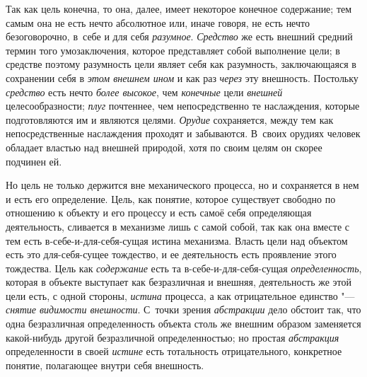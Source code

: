 Так как цель конечна, то она, далее, имеет некоторое конечное
содержание; тем самым она не есть нечто абсолютное или, иначе говоря, не
есть нечто безоговорочно, в~себе и для себя
{\em разумное}.
{\em Средство} же есть
внешний средний термин того умозаключения, которое представляет собой
выполнение цели; в средстве поэтому разумность цели являет себя как
разумность, заключающаяся в сохранении себя в
{\em этом внешнем ином}
и как раз {\em через}
эту внешность. Постольку
{\em средство} есть нечто
{\em более высокое}, чем
{\em конечные} цели
{\em внешней}
целесообразности;
{\em плуг} почтеннее, чем
непосредственно те наслаждения, которые подготовляются им и являются
целями. {\em Орудие}
сохраняется, между тем как непосредственные наслаждения
проходят и забываются. В~своих орудиях человек обладает властью над внешней
природой, хотя по своим целям он скорее подчинен ей.

Но цель не только держится вне механического процесса, но и
сохраняется в нем и есть его определение. Цель, как понятие, которое
существует свободно по отношению к объекту и его процессу и есть самоё себя
определяющая деятельность, сливается в механизме лишь с самой собой, так
как она вместе с тем есть в-себе-и-для-себя-сущая истина механизма. Власть
цели над объектом есть это для-себя-сущее тождество, и ее деятельность есть
проявление этого тождества. Цель как
{\em содержание} есть та
в-себе-и-для-себя-сущая
{\em определенность},
которая в объекте выступает как безразличная и внешняя,
деятельность же этой цели есть, с одной стороны,
{\em истина} процесса, а
как отрицательное единство "--- {\em снятие
видимости внешности}. С~точки зрения
{\em абстракции} дело
обстоит так, что одна безразличная определенность объекта столь же внешним
образом заменяется какой-нибудь другой безразличной определенностью; но
простая {\em абстракция}
определенности в своей
{\em истине} есть
тотальность отрицательного, конкретное понятие, полагающее внутри себя
внешность.

